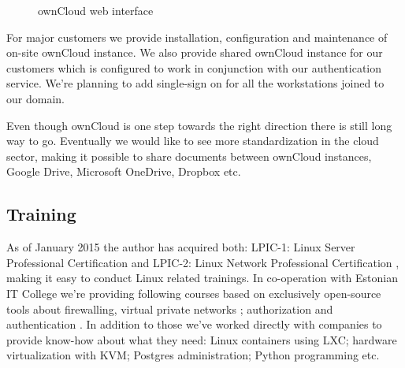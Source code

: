 \documentclass{article}
\begin{document}
\begin{figure}[!htb]
\centering
{}
\caption{ownCloud web interface}
\label{fig:owncloud}
\end{figure}

For major customers we provide installation,
configuration and maintenance of on-site ownCloud instance.
We also provide shared ownCloud instance
for our customers which is configured to work
in conjunction with our authentication service.
We're planning to add single-sign on
for all the workstations joined to our domain.

Even though ownCloud is one step towards the right direction
there is still long way to go.
Eventually we would like to see more standardization
in the cloud sector, making it possible
to share documents between ownCloud instances,
Google Drive, Microsoft OneDrive, Dropbox etc.

\subsection{Training}

As of January 2015 the author has acquired both:
LPIC-1: Linux Server Professional Certification \cite{lpic-1} and
LPIC-2: Linux Network Professional Certification \cite{lpic-2},
making it easy to conduct Linux related trainings.
In co-operation with Estonian IT College we're providing
following courses based on exclusively open-source tools
about firewalling, virtual private networks
\cite{firewalls-and-virtual-private-networks};
authorization and authentication \cite{authentication-and-authorization}.
In addition to those we've worked directly with companies to
provide know-how about what they need:
Linux containers using LXC;
hardware virtualization with KVM;
Postgres administration;
Python programming etc.
\end{document}
